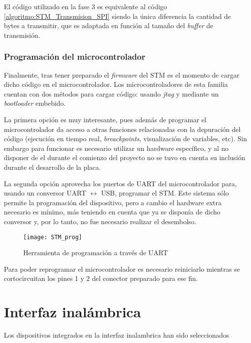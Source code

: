 El código utilizado en la fase 3 es equivalente al código \ref{algoritmo:STM_Transmision_SPI} siendo la única diferencia la cantidad de bytes a transmitir, que es adaptada en función al tamaño del \textit{buffer} de transmisión.

\subsubsection{Programación del microcontrolador\label{sec:Software_micro_ESP}}

Finalmente, tras tener preparado el \textit{firmware} del STM es el momento de cargar dicho código en el microcontrolador. Los microcontroladores de esta familia cuentan con dos métodos para cargar código: usando \textit{jtag} y mediante un \textit{bootloader} embebido.

La primera opción es muy interesante, pues además de programar el microcontrolador da acceso a otras funciones relacionadas con la depuración del código (ejecución en tiempo real, \textit{breackpoints}, visualización de variables, etc). Sin embargo para funcionar es necesario utilizar un hardware específico, y al no disponer de el durante el comienzo del proyecto no se tuvo en cuenta su inclusión durante el desarrollo de la placa.

La segunda opción aprovecha los puertos de UART del microcontrolador para, usando un conversor UART $\leftrightarrow$ USB, programar el STM. Este sistema sólo permite la programación del dispositivo, pero a cambio el hardware extra necesario es mínimo, más teniendo en cuenta que ya se disponía de dicho conversor y, por lo tanto, no fue necesario realizar el desembolso.

\begin{figure} [h]
    \centering
    \texttt{[image: STM\_prog]}
    \caption{Herramienta de programación a través de UART}
    \label{fig:STM_prog}
\end{figure}

Para poder reprogramar el microcontrolador es necesario reiniciarlo mientras se cortocircuitan los pines 1 y 2 del conector preparado para ese fin.

\clearpage

\section{Interfaz inalámbrica\label{sec:Software_inalambrica}}



Los dispositivos integrados en la interfaz inalambrica han sido seleccionados 

%		
%
